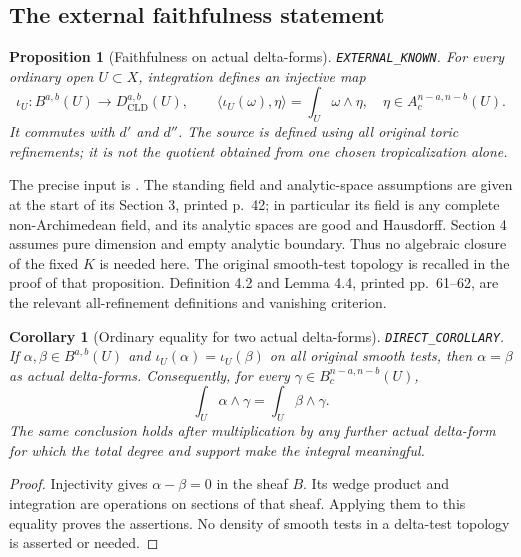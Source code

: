 \documentclass[11pt,a4paper]{article}
\numberwithin{equation}{section}
\newtheorem{proposition}[theorem]{Proposition}
\newtheorem{corollary}[theorem]{Corollary}
\theoremstyle{definition}
\theoremstyle{remark}
\begin{document}
\subsection{The external faithfulness statement}

\begin{proposition}[Faithfulness on actual delta-forms]
\label{prop:r6-delta-faithfulness}
\textnormal{\texttt{EXTERNAL\_KNOWN}.}
For every ordinary open $U\subset X$, integration defines an injective
map
\[
 \iota_U:B^{a,b}(U)\longrightarrow D^{a,b}_{\mathrm{CLD}}(U),
 \qquad
 \langle\iota_U(\omega),\eta\rangle
       =\int_U\omega\wedge\eta,
 \quad \eta\in A_c^{n-a,n-b}(U).
\]
It commutes with $d'$ and $d''$.  The source is defined using all original
toric refinements; it is not the quotient obtained from one chosen
tropicalization alone.
\end{proposition}

The precise input is \cite[Proposition 4.11, printed pp.~70--71]{Mih24}.
The standing field and analytic-space assumptions are given at the
start of its Section 3, printed p.~42; in particular its field is any
complete non-Archimedean field, and its analytic spaces are good and
Hausdorff.  Section 4 assumes pure dimension and empty analytic boundary.
Thus no algebraic closure of the fixed $K$ is needed here.  The original
smooth-test topology is recalled in the proof of that proposition.
Definition 4.2 and Lemma 4.4, printed pp.~61--62, are the relevant
all-refinement definitions and vanishing criterion.

\begin{corollary}[Ordinary equality for two actual delta-forms]
\label{cor:r6-ordinary-to-full-delta}
\textnormal{\texttt{DIRECT\_COROLLARY}.}
If $\alpha,\beta\in B^{a,b}(U)$ and
$\iota_U(\alpha)=\iota_U(\beta)$ on all original smooth tests, then
$\alpha=\beta$ as actual delta-forms.  Consequently, for every
$\gamma\in B_c^{n-a,n-b}(U)$,
\[
                         \int_U\alpha\wedge\gamma
                           =\int_U\beta\wedge\gamma.
\]
The same conclusion holds after multiplication by any further actual
delta-form for which the total degree and support make the integral
meaningful.
\end{corollary}

\begin{proof}
Injectivity gives $\alpha-\beta=0$ in the sheaf $B$.  Its wedge product
and integration are operations on sections of that sheaf.  Applying
them to this equality proves the assertions.  No density of smooth
tests in a delta-test topology is asserted or needed.
\end{proof}
\end{document}
